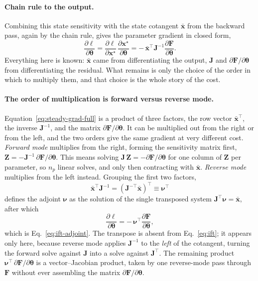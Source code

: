 \documentclass{article}
\begin{document}
\paragraph{Chain rule to the output.} Combining this state sensitivity with the state cotangent \(\bar{\mathbf{x}}\) from the backward pass, again by the chain rule, gives the parameter gradient in closed form,
\begin{equation}
\frac{\partial\ell}{\partial\boldsymbol{\theta}}
=\frac{\partial\ell}{\partial\mathbf{x}^\star}\,\frac{\partial\mathbf{x}^\star}{\partial\boldsymbol{\theta}}
=-\,\bar{\mathbf{x}}^{\top}\mathbf{J}^{-1}\frac{\partial\mathbf{F}}{\partial\boldsymbol{\theta}}.
\label{eq:steady-grad-full}
\end{equation}
Everything here is known: \(\bar{\mathbf{x}}\) came from differentiating the output, \(\mathbf{J}\) and \(\partial\mathbf{F}/\partial\boldsymbol{\theta}\) from differentiating the residual. What remains is only the choice of the order in which to multiply them, and that choice is the whole story of the cost.

\paragraph{The order of multiplication is forward versus reverse mode.} Equation~\eqref{eq:steady-grad-full} is a product of three factors, the row vector \(\bar{\mathbf{x}}^{\top}\), the inverse \(\mathbf{J}^{-1}\), and the matrix \(\partial\mathbf{F}/\partial\boldsymbol{\theta}\). It can be multiplied out from the right or from the left, and the two orders give the same gradient at very different cost.
\emph{Forward mode} multiplies from the right, forming the sensitivity matrix first, \(\mathbf{Z}=-\mathbf{J}^{-1}\,\partial\mathbf{F}/\partial\boldsymbol{\theta}\). This means solving \(\mathbf{J}\,\mathbf{Z}=-\partial\mathbf{F}/\partial\boldsymbol{\theta}\) for one column of \(\mathbf{Z}\) per parameter, so \(n_p\) linear solves, and only then contracting with \(\bar{\mathbf{x}}\).
\emph{Reverse mode} multiplies from the left instead. Grouping the first two factors,
\[
\bar{\mathbf{x}}^{\top}\mathbf{J}^{-1}=\left(\mathbf{J}^{-\top}\bar{\mathbf{x}}\right)^{\top}\equiv\boldsymbol{\nu}^{\top}
\]
defines the adjoint \(\boldsymbol{\nu}\) as the solution of the single transposed system \(\mathbf{J}^{\top}\boldsymbol{\nu}=\bar{\mathbf{x}}\), after which
\[
\frac{\partial\ell}{\partial\boldsymbol{\theta}}=-\,\boldsymbol{\nu}^{\top}\frac{\partial\mathbf{F}}{\partial\boldsymbol{\theta}},
\]
which is Eq.~\eqref{eq:ift-adjoint}. The transpose is absent from Eq.~\eqref{eq:ift}; it appears only here, because reverse mode applies \(\mathbf{J}^{-1}\) to the \emph{left} of the cotangent, turning the forward solve against \(\mathbf{J}\) into a solve against \(\mathbf{J}^{\top}\). The remaining product \(\boldsymbol{\nu}^{\top}\,\partial\mathbf{F}/\partial\boldsymbol{\theta}\) is a vector--Jacobian product, taken by one reverse-mode pass through \(\mathbf{F}\) without ever assembling the matrix \(\partial\mathbf{F}/\partial\boldsymbol{\theta}\).
\end{document}
